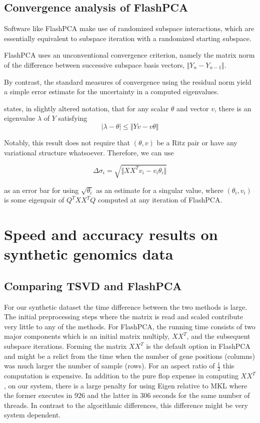 \documentclass[review]{siamart0516}
\begin{document}
\subsection{Convergence analysis of FlashPCA}

Software like FlashPCA make use of randomized subspace interactions, which are
essentially equivalent to subspace iteration with a randomized starting subspace.

FlashPCA uses an unconventional convergence criterion, namely the matrix norm
of the difference between successive subspace basis vectors,
$\Vert Y_n - Y_{n-1} \Vert$.

By contrast, the standard measures of convergence using the residual norm yield
a simple error estimate for the uncertainty in a computed eigenvalues.

\cite[Theorem 4.5.1]{Parlett1998} states, in slightly altered notation, that for
any scalar $\theta$ and vector $v$, there is an eigenvalue $\lambda$ of $Y$ satisfying
\[
\vert\lambda - \theta\vert \le \Vert Y v - v \theta \Vert
\]

Notably, this result does not require that $(\theta, v)$ be a Ritz pair or have
any variational structure whatsoever. Therefore, we can use

\[
\Delta \sigma_i = \sqrt{\Vert X X^T v_i - v_i \theta_i \Vert}
\]

as an error bar for using $\sqrt{\theta_i}$ as an estimate for a singular value,
where $(\theta_i, v_i)$ is some eigenpair of $Q^T X X^T Q$ computed at any
iteration of FlashPCA.



\section{Speed and accuracy results on synthetic genomics data}

\subsection{Comparing TSVD and FlashPCA}
For our synthetic dataset the time difference between the two methods is large. The initial preprocessing steps where the matrix is read and scaled contribute very little to any of the methods. For FlashPCA, the running time consists of two major components which is an initial matrix multiply, $XX^T$, and the subsequent subspace iterations. Forming the matrix $XX^T$ is the default option in FlashPCA and might be a relict from the time when the number of gene positions (columns) was much larger the number of sample (rows). For an aspect ratio of $\frac{1}{2}$ this computation is expensive. In addition to the pure flop expense in computing $XX^T$, on our system, there is a large penalty for using Eigen relative to MKL where the former executes in 926 and the latter in 306 seconds for the same number of threads. In contrast to the algorithmic differences, this difference might be very system dependent.
\end{document}
